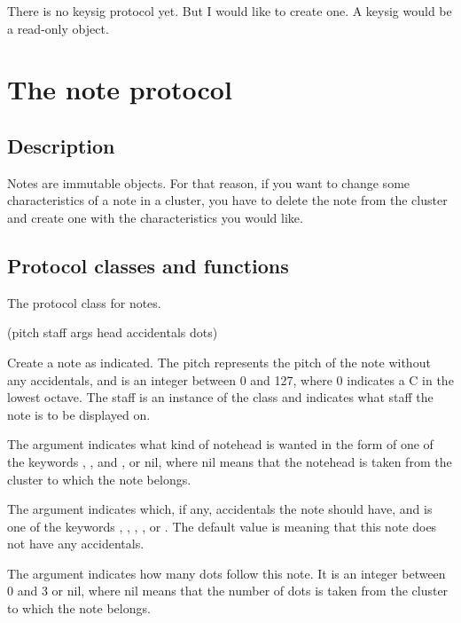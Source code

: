There is no keysig protocol yet.  But I would like to create one.  A
keysig would be a read-only object.  

\section{The note protocol}

\subsection{Description}

Notes are immutable objects.  For that reason, if you want to change
some characteristics of a note in a cluster, you have to delete the
note from the cluster and create one with the characteristics you
would like. 

\subsection{Protocol classes and functions}


The protocol class for notes. 

 (pitch staff \rest args \key head accidentals dots)

Create a note as indicated.  The pitch represents the pitch of the
note without any accidentals, and is an integer between 0 and 127,
where 0 indicates a C in the lowest octave.  The staff is an instance
of the class  and indicates what staff the note is to
be displayed on.  

The  argument indicates what kind of notehead is wanted
in the form of one of the keywords , ,
and , or nil, where nil means that the notehead is
taken from the cluster to which the note belongs.

The  argument indicates which, if any,
accidentals the note should have, and is one of the keywords 
, , ,
, or .  The default value is
 meaning that this note does not have any
accidentals. 

The  argument indicates how many dots follow this note.
It is an integer between 0 and 3 or nil, where nil means that the
number of dots is taken  from the cluster to which the note belongs.

